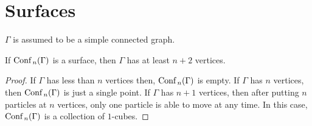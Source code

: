 \chapter{Surfaces}
\(\Gamma\) is assumed to be a simple connected graph.

\begin{lem}
\label{lem:is_surface_0}
If \(\text{Conf}\,_n(\Gamma)\) is a surface, then \(\Gamma\) has at least \(n+2\) vertices.
\end{lem}
\begin{proof}
    If \(\Gamma\) has less than \(n\) vertices then, \(\text{Conf}\,_n(\Gamma)\) is empty.
    If \(\Gamma\) has \(n\) vertices, then \(\text{Conf}\,_n(\Gamma)\) is just a single point.
    If \(\Gamma\) has \(n + 1\) vertices, then after putting \(n\) particles at \(n\) vertices, only one particle is able to move at any time.
    In this case, \(\text{Conf}\,_n(\Gamma)\) is a collection of \(1\)-cubes.
\end{proof}


